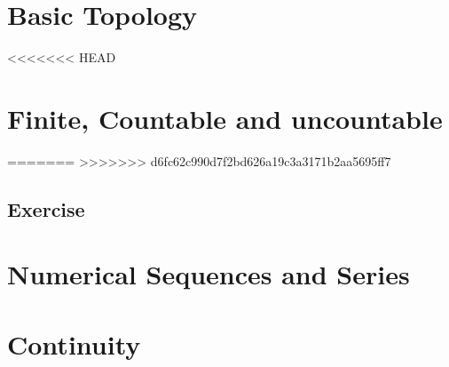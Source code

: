 \documentclass[
]{book}
\theoremstyle{definition}
\theoremstyle{definition}
\theoremstyle{definition}
\theoremstyle{definition}
\theoremstyle{remark}
\begin{document}
\chapter{Basic Topology}\label{basic-topology}

<<<<<<< HEAD
\chapter{Finite, Countable and uncountable}\label{finite-countable-and-uncountable}

=======
>>>>>>> d6fc62c990d7f2bd626a19c3a3171b2aa5695ff7
\section{Exercise}\label{exercise-1}

\chapter{Numerical Sequences and Series}\label{numerical-sequences-and-series}

\chapter{Continuity}\label{continuity}

  
\end{document}
